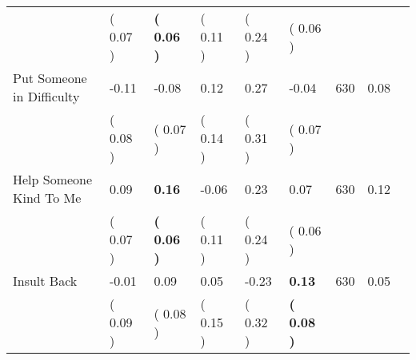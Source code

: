 \begin{tabular}{L{6.2cm} C{1.8cm} C{1.8cm} C{1.8cm} C{1.8cm} C{1.8cm} C{1.8cm} C{0.3cm} C{0.3cm}}
 & (     0.07 ) & \textbf{(     0.06 )} & (     0.11 ) & (     0.24 ) & (     0.06 )  & \\
Put Someone in Difficulty &     -0.11 &     -0.08 &      0.12 &      0.27 &     -0.04  & 630 &       0.08 \\ 
 & (     0.08 ) & (     0.07 ) & (     0.14 ) & (     0.31 ) & (     0.07 )  & \\
Help Someone Kind To Me &      0.09 & \textbf{     0.16} &     -0.06 &      0.23 &      0.07  & 630 &       0.12 \\ 
 & (     0.07 ) & \textbf{(     0.06 )} & (     0.11 ) & (     0.24 ) & (     0.06 )  & \\
Insult Back &     -0.01 &      0.09 &      0.05 &     -0.23 & \textbf{     0.13}  & 630 &       0.05 \\ 
 & (     0.09 ) & (     0.08 ) & (     0.15 ) & (     0.32 ) & \textbf{(     0.08 )}  & \\
\bottomrule
\end{tabular}
